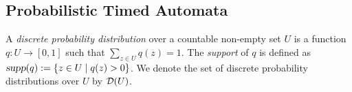 \vspace{-1.5em}
\subsection{Probabilistic Timed Automata}
\vspace{-0.6em}

A \emph{discrete probability distribution} over a countable non-empty set $U$ is a function $q:U\rightarrow[0,1]$ such that $\sum_{z\in U}q(z)=1$.
The \emph{support} of $q$ is defined as ${\mbox{\sl supp}}(q):=\{z\in U\mid q(z)>0\}$.
We denote the set of discrete probability distributions over $U$ by ${\mathcal{D}}{\left(U\right)}$.

